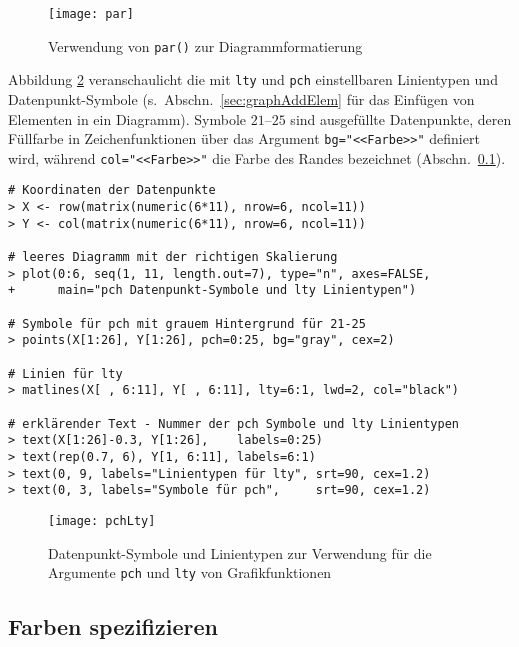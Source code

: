 \begin{figure}[ht]
\centering
\texttt{[image: par]}
\vspace*{-1em}
\caption{Verwendung von \lstinline!par()! zur Diagrammformatierung}
\label{fig:par}
\end{figure}

Abbildung \ref{fig:pchLty} veranschaulicht die mit \lstinline!lty! und \lstinline!pch! einstellbaren Linientypen und Datenpunkt-Symbole (s.\ Abschn.\ \ref{sec:graphAddElem} für das Einfügen von Elementen in ein Diagramm). Symbole $21$--$25$ sind ausgefüllte Datenpunkte, deren Füllfarbe in Zeichenfunktionen über das Argument \lstinline!bg="<<Farbe>>"! definiert wird, während \lstinline!col="<<Farbe>>"! die Farbe des Randes bezeichnet (Abschn.\ \ref{sec:colors}).
\begin{lstlisting}
# Koordinaten der Datenpunkte
> X <- row(matrix(numeric(6*11), nrow=6, ncol=11))
> Y <- col(matrix(numeric(6*11), nrow=6, ncol=11))

# leeres Diagramm mit der richtigen Skalierung
> plot(0:6, seq(1, 11, length.out=7), type="n", axes=FALSE,
+      main="pch Datenpunkt-Symbole und lty Linientypen")

# Symbole für pch mit grauem Hintergrund für 21-25
> points(X[1:26], Y[1:26], pch=0:25, bg="gray", cex=2)

# Linien für lty
> matlines(X[ , 6:11], Y[ , 6:11], lty=6:1, lwd=2, col="black")

# erklärender Text - Nummer der pch Symbole und lty Linientypen
> text(X[1:26]-0.3, Y[1:26],    labels=0:25)
> text(rep(0.7, 6), Y[1, 6:11], labels=6:1)
> text(0, 9, labels="Linientypen für lty", srt=90, cex=1.2)
> text(0, 3, labels="Symbole für pch",     srt=90, cex=1.2)
\end{lstlisting}

\begin{figure}[ht]
\centering
\texttt{[image: pchLty]}
\vspace*{-1em}
\caption{Datenpunkt-Symbole und Linientypen zur Verwendung für die Argumente \lstinline!pch! und \lstinline!lty! von Grafikfunktionen}
\label{fig:pchLty}
\end{figure}

\subsection{Farben spezifizieren}
\label{sec:colors}

